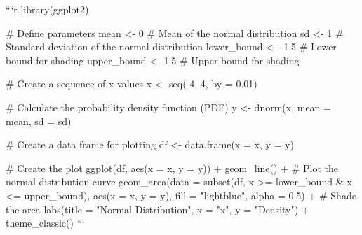 

```{r}
library(ggplot2)

# Define parameters
mean <- 0  # Mean of the normal distribution
sd <- 1    # Standard deviation of the normal distribution
lower_bound <- -1.5  # Lower bound for shading
upper_bound <- 1.5   # Upper bound for shading

# Create a sequence of x-values
x <- seq(-4, 4, by = 0.01)

# Calculate the probability density function (PDF)
y <- dnorm(x, mean = mean, sd = sd)

# Create a data frame for plotting
df <- data.frame(x = x, y = y)

# Create the plot
ggplot(df, aes(x = x, y = y)) +
  geom_line() +  # Plot the normal distribution curve
  geom_area(data = subset(df, x >= lower_bound & x <= upper_bound), 
           aes(x = x, y = y), fill = "lightblue", alpha = 0.5) +  # Shade the area
  labs(title = "Normal Distribution", x = "x", y = "Density") +
  theme_classic()
```
